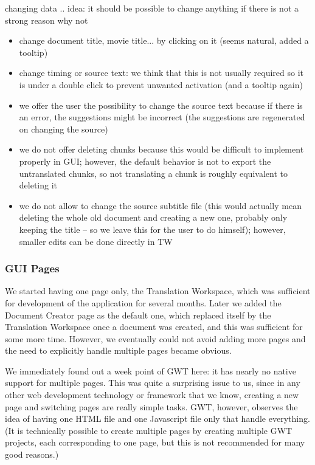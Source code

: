 changing data .. idea: it should be possible to change anything if there is not a strong reason why not
\begin{itemize}
\item change document title, movie title... by clicking on it (seems natural, added a tooltip)

\item change timing or source text: we think that this is not usually required so it is under a double click to prevent unwanted activation (and a tooltip again)

\item we offer the user the possibility to change the source text because if there is an error, the suggestions might be incorrect (the suggestions are regenerated on changing the source)

\item we do not offer deleting chunks because this would be difficult to implement properly in GUI; however, the default behavior is not to export the untranslated chunks, so not translating a chunk is roughly equivalent to deleting it

\item we do not allow to change the source subtitle file (this would actually mean deleting the whole old document and creating a new one, probably only keeping the title -- so we leave this for the user to do himself); however, smaller edits can be done directly in TW
\end{itemize}

\subsubsection{GUI Pages}

We started having one page only, the Translation Workspace, which was sufficient for development of the application for several months. Later we added the Document  Creator page as the default one, which replaced itself by the Translation Workspace once a document was created, and this was sufficient for some more time. However, we eventually could not avoid adding more pages and the need to explicitly handle multiple pages became obvious.

We immediately found out a week point of GWT here: it has nearly no native support for multiple pages. This was quite a surprising issue to us, since in any other web development technology or framework that we know, creating a new page and switching pages are really simple tasks. GWT, however, observes the idea of having one HTML file and one Javascript file only that handle everything. (It is technically possible to create multiple pages by creating multiple GWT projects, each corresponding to one page, but this is not recommended for many good reasons.)

